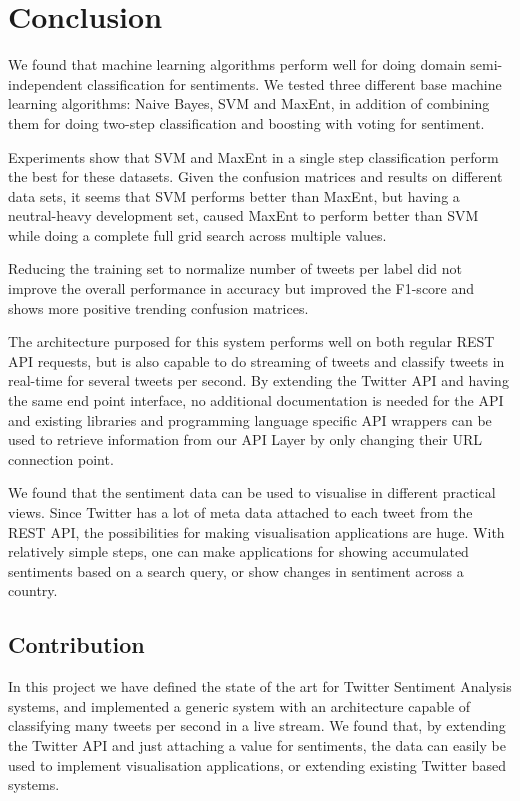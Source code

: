 \chapter{Conclusion}

We found that machine learning algorithms perform well for doing domain semi-independent classification for sentiments. We tested three different base machine learning algorithms: Naive Bayes, SVM and MaxEnt, in addition of combining them for doing two-step classification and boosting with voting for sentiment. 

Experiments show that SVM and MaxEnt in a single step classification perform the best for these datasets. Given the confusion matrices and results on different data sets, it seems that SVM performs better than MaxEnt, but having a neutral-heavy development set, caused MaxEnt to perform better than SVM while doing a complete full grid search across multiple values.

Reducing the training set to normalize number of tweets per label did not improve the overall performance in accuracy but improved the F1-score and shows more positive trending confusion matrices. 

The architecture purposed for this system performs well on both regular REST API requests, but is also capable to do streaming of tweets and classify tweets in real-time for several tweets per second. By extending the Twitter API and having the same end point interface, no additional documentation is needed for the API and existing libraries and programming language specific API wrappers can be used to retrieve information from our API Layer by only changing their URL connection point. 

We found that the sentiment data can be used to visualise in different practical views. Since Twitter has a lot of meta data attached to each tweet from the REST API, the possibilities for making visualisation applications are huge. With relatively simple steps, one can make applications for showing accumulated sentiments based on a search query, or show changes in sentiment across a country. 

\section{Contribution}

In this project we have defined the state of the art for Twitter Sentiment Analysis systems, and implemented a generic system with an architecture capable of classifying many tweets per second in a live stream. We found that, by extending the Twitter API and just attaching a value for sentiments, the data can easily be used to implement visualisation applications, or extending existing Twitter based systems. 


